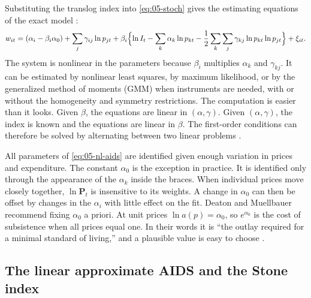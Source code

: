 Substituting the translog index into \eqref{eq:05-stoch} gives the estimating equations of the exact model
\citep[eq.~15]{DeatonMuellbauer1980a}:
\begin{equation}\label{eq:05-nl-aids}
  w_{it} = (\alpha_i - \beta_i\alpha_0) + \sum_j\gamma_{ij}\ln p_{jt}
  + \beta_i\Bigl\{\ln I_t - \sum_k\alpha_k\ln p_{kt}
  - \frac{1}{2}\sum_k\sum_j\gamma_{kj}\ln p_{kt}\ln p_{jt}\Bigr\} + \xi_{it}.
\end{equation}
The system is nonlinear in the parameters because $\beta_i$ multiplies $\alpha_k$ and $\gamma_{kj}$. It can
be estimated by nonlinear least squares, by maximum likelihood, or by the generalized method of moments
(GMM) when instruments are needed, with or without the homogeneity and symmetry restrictions. The
computation is easier than it looks. Given $\beta$, the equations are linear in $(\alpha, \gamma)$.
Given $(\alpha, \gamma)$, the index is known and the equations are linear in $\beta$. The first-order
conditions can therefore be solved by alternating between two linear problems
\citep[p.~316]{DeatonMuellbauer1980a}.

All parameters of \eqref{eq:05-nl-aids} are identified given enough variation in prices and expenditure.
The constant $\alpha_0$ is the exception in practice. It is identified only through the appearance of the
$\alpha_k$ inside the braces. When individual prices move closely together, $\ln\mathbf{P}_t$ is
insensitive to its weights. A change in $\alpha_0$ can then be offset by changes in the $\alpha_i$ with
little effect on the fit. Deaton and Muellbauer recommend fixing $\alpha_0$ a priori. At unit prices
$\ln a(p) = \alpha_0$, so $e^{\alpha_0}$ is the cost of subsistence when all prices equal one. In their
words it is ``the outlay required for a minimal standard of living,'' and a plausible value is easy to
choose \citep[p.~316]{DeatonMuellbauer1980a}.

\subsection{The linear approximate AIDS and the Stone index}\label{sec:05-stone}

